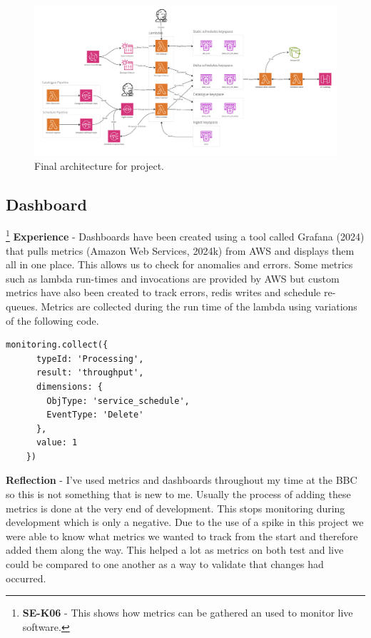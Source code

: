   \begin{landscape}
    \begin{figure}[H]
      \centering
      \includegraphics[width=20cm]{assets/outputs/finalArchitecture.png}
      \caption{Final architecture for project.}
      \label{fig:finalArchitecture}
    \end{figure}
  \end{landscape}

  \newpage
  \subsection{Dashboard}

  \footnote{\textbf{SE-K06} - This shows how metrics can be gathered an used to monitor live software.}
  \textbf{Experience} - Dashboards have been created using a tool called Grafana (2024) that pulls metrics (Amazon Web Services, 2024k) from AWS and
  displays them all in one place. This allows us to check for anomalies and errors. Some metrics such as lambda run-times and invocations are provided by 
  AWS but custom metrics have also been created to track errors, redis writes and schedule re-queues. Metrics are collected during the run time of the 
  lambda using variations of the following code.

   \begin{lstlisting}[caption=Code used to update a metric\, this variation tracks a schedule delete.]
    monitoring.collect({
      typeId: 'Processing',
      result: 'throughput',
      dimensions: {
        ObjType: 'service_schedule',
        EventType: 'Delete'
      },
      value: 1
    })
  \end{lstlisting}

  \textbf{Reflection} - I've used metrics and dashboards throughout my time at the BBC so this is not something that is new to me. Usually the process of 
  adding these metrics is done at the very end of development. This stops monitoring during development which is only a negative. Due to the use of a spike 
  in this project we were able to know what metrics we wanted to track from the start and therefore added them along the way. This helped a lot as metrics on 
  both test and live could be compared to one another as a way to validate that changes had occurred.
  
